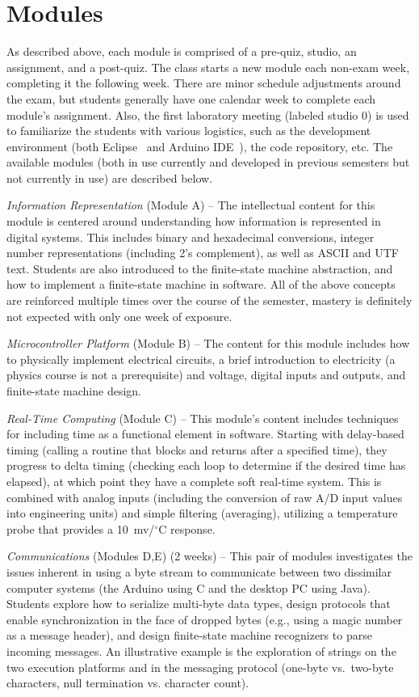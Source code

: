 \section{Modules}
\label{sec:weeks}

As described above, each module is comprised of a pre-quiz, studio,
an assignment, and a post-quiz.  The class starts a new module each
non-exam week, completing it the following week. There are minor schedule
adjustments around the exam, but students generally have one calendar week
to complete each module's assignment.
Also, the first laboratory meeting (labeled studio 0) is used to familiarize
the students with various logistics, such as the development environment
(both Eclipse~\cite{eclipse} and Arduino IDE~\cite{arduino}),
the code repository, etc.
The available modules
(both in use currently and developed in previous semesters but not
currently in use) are described below.

\emph{Information Representation} (Module A) --
The intellectual content for this module is centered around understanding
how information is represented in digital systems. This includes binary and
hexadecimal conversions, integer
number representations (including 2's complement), as well as
ASCII and UTF text.
Students are also introduced to the finite-state machine abstraction,
and how to implement a finite-state machine in software.
All of the above concepts are reinforced multiple times over the course
of the semester, mastery is definitely not expected with only one week
of exposure.

\emph{Microcontroller Platform} (Module B) --
The content for this module includes how to physically implement electrical
circuits, a brief introduction to electricity (a physics course is not a
prerequisite) and voltage, digital inputs and outputs, and finite-state
machine design.

\emph{Real-Time Computing} (Module C) --
This module's content includes techniques for including time as a functional
element in software. Starting with delay-based timing (calling a routine
that blocks and returns after a specified time), they progress to delta
timing (checking each loop to determine if the desired time has elapsed),
at which point they have a complete soft real-time system.
This is combined with analog inputs (including the conversion of raw A/D
input values into engineering units) and simple filtering (averaging),
utilizing a temperature probe that provides a 10~mv/$^\circ$C response.

\emph{Communications} (Modules D,E) (2 weeks) --
This pair of modules investigates the issues inherent in using a byte stream
to communicate between two dissimilar computer systems (the Arduino using C
and the desktop PC using Java).  Students explore how
to serialize multi-byte data types, design protocols that enable synchronization
in the face of dropped bytes (e.g., using a magic number as a message header),
and design finite-state machine recognizers to parse incoming messages.
An illustrative example is the exploration of strings on the two execution
platforms and in the messaging protocol (one-byte vs.~two-byte characters,
null termination vs. character count).

